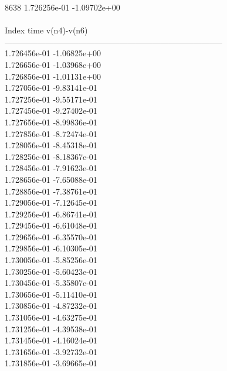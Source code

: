 8638	1.726256e-01	-1.09702e+00	\\ \hline
\\ \hline
Index   time            v(n4)-v(n6)     \\ \hline
--------------------------------------------------------------------------------\\ 	1.726456e-01	-1.06825e+00	\\ 	1.726656e-01	-1.03968e+00	\\ 	1.726856e-01	-1.01131e+00	\\ 	1.727056e-01	-9.83141e-01	\\ 	1.727256e-01	-9.55171e-01	\\ 	1.727456e-01	-9.27402e-01	\\ 	1.727656e-01	-8.99836e-01	\\ 	1.727856e-01	-8.72474e-01	\\ 	1.728056e-01	-8.45318e-01	\\ 	1.728256e-01	-8.18367e-01	\\ 	1.728456e-01	-7.91623e-01	\\ 	1.728656e-01	-7.65088e-01	\\ 	1.728856e-01	-7.38761e-01	\\ 	1.729056e-01	-7.12645e-01	\\ 	1.729256e-01	-6.86741e-01	\\ 	1.729456e-01	-6.61048e-01	\\ 	1.729656e-01	-6.35570e-01	\\ 	1.729856e-01	-6.10305e-01	\\ 	1.730056e-01	-5.85256e-01	\\ 	1.730256e-01	-5.60423e-01	\\ 	1.730456e-01	-5.35807e-01	\\ 	1.730656e-01	-5.11410e-01	\\ 	1.730856e-01	-4.87232e-01	\\ 	1.731056e-01	-4.63275e-01	\\ 	1.731256e-01	-4.39538e-01	\\ 	1.731456e-01	-4.16024e-01	\\ 	1.731656e-01	-3.92732e-01	\\ 	1.731856e-01	-3.69665e-01	\\ \hline
